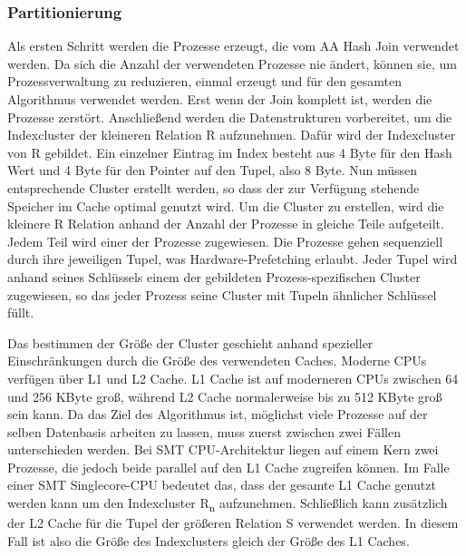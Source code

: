 \subsubsection*{Partitionierung}
\label{sec:AA-Hash-Join_Partitionierung}

Als ersten Schritt werden die Prozesse erzeugt, die vom AA Hash Join verwendet werden. Da sich die Anzahl der verwendeten Prozesse nie ändert, können sie, um Prozessverwaltung zu reduzieren, einmal erzeugt und für den gesamten Algorithmus verwendet werden. Erst wenn der Join komplett ist, werden die Prozesse zerstört. Anschließend werden die Datenstrukturen vorbereitet, um die Indexcluster der kleineren Relation R aufzunehmen. Dafür wird der Indexcluster von R gebildet. Ein einzelner Eintrag im Index besteht aus 4 Byte für den Hash Wert und 4 Byte für den Pointer auf den Tupel, also 8 Byte. Nun müssen entsprechende Cluster erstellt werden, so dass der zur Verfügung stehende Speicher im Cache optimal genutzt wird. Um die Cluster zu erstellen, wird die kleinere R Relation anhand der Anzahl der Prozesse in gleiche Teile aufgeteilt. Jedem Teil wird einer der Prozesse zugewiesen. Die Prozesse gehen sequenziell durch ihre jeweiligen Tupel, was Hardware-Prefetching erlaubt. Jeder Tupel wird anhand seines Schlüssels einem der gebildeten Prozess-spezifischen Cluster zugewiesen, so das jeder Prozess seine Cluster mit Tupeln ähnlicher Schlüssel füllt.

Das bestimmen der Größe der Cluster geschieht anhand spezieller Einschränkungen durch die Größe des verwendeten Caches. Moderne CPUs verfügen über L1 und L2 Cache. L1 Cache ist auf moderneren CPUs zwischen 64 und 256 KByte groß, während L2 Cache normalerweise bis zu 512 KByte groß sein kann. Da das Ziel des Algorithmus ist, möglichst viele Prozesse auf der selben Datenbasis arbeiten zu lassen, muss zuerst zwischen zwei Fällen unterschieden werden. Bei SMT CPU-Architektur  liegen auf einem Kern zwei Prozesse, die jedoch beide parallel auf den L1 Cache zugreifen können. Im Falle einer SMT Singlecore-CPU bedeutet das, dass der gesamte L1 Cache genutzt werden kann um den Indexcluster R\textsubscript{n} aufzunehmen. Schließlich kann zusätzlich der L2 Cache für die Tupel der größeren Relation S verwendet werden. In diesem Fall ist also die Größe des Indexclusters gleich der Größe des L1 Caches.

